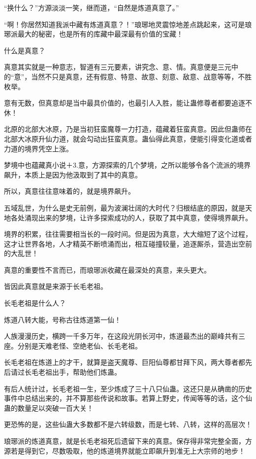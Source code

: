 
\begin{this_body}

“换什么？”方源淡淡一笑，继而道，“自然是炼道真意了。”

“啊！你居然知道我派中藏有炼道真意？！”琅琊地灵震惊地差点跳起来，这可是琅琊派最大的秘密，也是所有的库藏中最深最有价值的宝藏！

什么是真意？

真意其实就是一种意志，智道有三元要素，讲究念、意、情。真意便是三元中的“意”，当然不只是真意，还有假意、特意、故意、刻意、敌意、战意等等，不胜枚举。

意有无数，但真意却是当中最具价值的，也最引人入胜，能让蛊修尊者都要追逐不休！

北原的北部大冰原，乃是当初狂蛮魔尊一力打造，蕴藏着狂蛮真意。因此但蛊师在北部大冰原升仙力道，就会勾动出狂蛮真意。蛊仙得此真意，便能引得变化道或者力道的境界凭空上涨。

梦境中也蕴藏真小说＋3.意，方源探索的几个梦境，之所以能够令各个流派的境界飙升，本质上是因为他汲取到了其中的真意。

所以，真意往往意味着的，就是境界飙升。

五域乱世，为什么是史无前例，最为波澜壮阔的大时代？归根结底的原因，就是天地各处涌现出来的梦境，让许多探索成功的人，获取了其中真意，使得境界飙升。

境界的积累，往往需要相当长的一段时间。但是因为真意，大大缩短了这个过程，这才让世界各地，人才精英不断喷涌而出，相互碰撞较量，追逐厮杀，营造出空前的大乱世！

真意的重要性不言而已，而琅琊派收藏在最深处的真意，来头更大。

皆因此真意就是来源于长毛老祖。

长毛老祖是什么人？

炼道八转大能，号称古往炼道第一仙！

人族漫漫历史，横跨一千多万年，在这段光阴长河中，炼道最杰出的巅峰共有三座。分别是天难老怪、空绝老仙、长毛老祖。

长毛老祖在炼道上的才干，就算是盗天魔尊、巨阳仙尊都甘拜下风，两大尊者都先后请过长毛老祖出手，帮助他们炼蛊。

有后人统计过，长毛老祖一生，至少炼成了三十八只仙蛊。这还只是从确凿的历史事件中总结出来的，并不算那些传说和故事。若算上野史，传闻等等的话，这个仙蛊的数量足以突破一百大关！

更恐怖的是，这些仙蛊大多数都不是六转级数，而是七转、八转，这样的高层次！

琅琊派的炼道真意，就是长毛老祖死后遗留下来的真意。保存得非常完整全面，方源若是得到它，尽数吸取，他的炼道境界就能立即飙升到准无上大宗师的地步！


\end{this_body}
